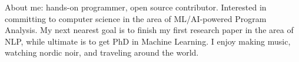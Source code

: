 \documentclass[10pt,a4paper,normalphoto]{altacv}
\begin{document}
  \makecvheader
  About me: hands-on programmer, open source contributor.
  Interested in committing to computer science in the area of ML/AI-powered
  Program Analysis. My next nearest goal is to finish my first research paper
  in the area of NLP, while ultimate is to get PhD in Machine Learning. I enjoy
  making music, watching nordic noir, and traveling around the world.
\end{document}
